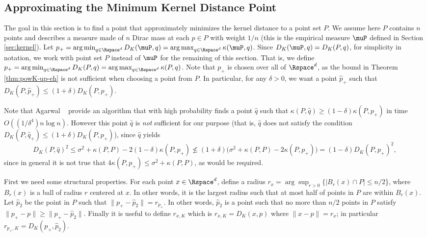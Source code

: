 \documentclass[11pt]{myclass}
\begin{document}
\subsection{Approximating the Minimum Kernel Distance Point}
\label{app:phat+}
The goal in this section is to find a point that approximately minimizes the kernel distance to a point set $P$.  We assume here $P$ contains $n$ points and describes a measure made of $n$ Dirac mass at each $p \in P$ with weight $1/n$ (this is the empirical measure $\muP$ defined in Section \ref{sec:kernel}).  
Let $p_+ = \arg \min_{q \in \Rspace^d} D_K(\muP,q) = \arg \max_{q \in \Rspace^d} \kappa(\muP,q)$. 
Since $D_K(\muP, q) = D_K(P, q)$, for simplicity in notation, we work with point set $P$ instead of $\muP$ for the remaining of this section. 
That is, we define $p_+ = \arg \min_{q \in \Rspace^d} D_K(P,q) = \arg \max_{q \in \Rspace^d} \kappa(P,q)$.  
Note that $p_+$ is chosen over all of $\Rspace^d$, as the bound in Theorem \ref{thm:powK-up-eh} is not sufficient when choosing a point from $P$.  
In particular, for any $\delta>0$, we want a point $\hat p_+$ such that $D_K(P,\hat p_+) \leq (1+\delta) D_K(P,p_+)$.  

Note that Agarwal \etal~\cite{AHKS13} provide an algorithm that with high probability finds a point $\hat q$ such that $\kappa(P,\hat q) \geq (1-\delta) \kappa(P,p_+)$ in time $O((1/\delta^4) n \log n)$.  However this point $\hat q$ is \emph{not} sufficient for our purpose
(that is, $\hat q$ does not satisfy the condition  $D_K(P,\hat q_+) \leq (1+\delta) D_K(P,p_+)$),  since $\hat q$ yields  
\[
D_K(P,\hat q)^2 \leq \sigma^2 + \kappa(P,P) - 2(1-\delta)\kappa(P,p_+) 
\nleq 
(1+\delta)\big(\sigma^2 + \kappa(P,P) - 2\kappa(P,p_+)\big) = (1-\delta) D_K(P,p_+)^2,
\]
since in general it is not true that $4\kappa(P,p_+) \leq \sigma^2 + \kappa(P,P)$, as would be required.  

First we need some structural properties. 
For each point $x \in \Rspace^d$, define a radius $r_x = \arg \sup_{r >0} \{|B_r(x) \cap P| \leq n/2$\}, where $B_r(x)$ is a ball of radius $r$ centered at $x$.  In other words, it is the largest radius such that at most half of points in $P$ are within $B_r(x)$.  
Let $\hat p_2$ be the point in $P$ such that $\|p_+ - \hat p_2\| = r_{p_+}$.  
In other words, $\hat p_2$ is a point such that no more than $n/2$ points in $P$ satisfy $\|p_+ - p\| \geq \|p_+ - \hat p_2\|$.  
Finally it is useful to define $r_{x,K}$ which is $r_{x,K} = D_K(x,p)$ where $\|x-p\| = r_x$; in particular $r_{p_+,K} = D_K(p_+, \hat p_2)$.  
\end{document}
